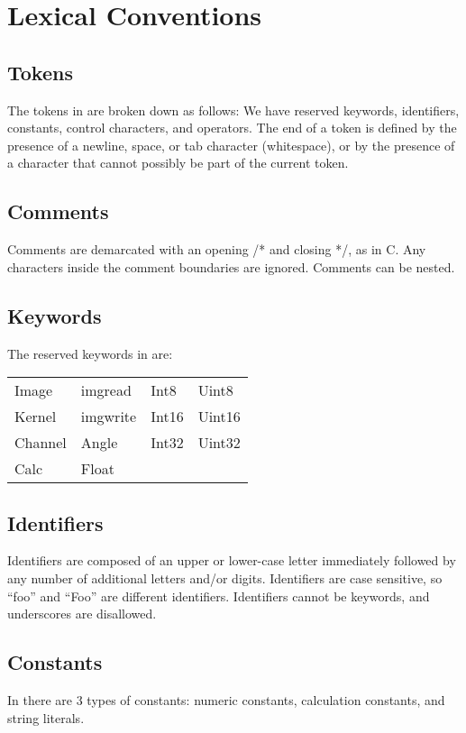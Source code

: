 \section{Lexical Conventions}
\label{sec:lex}

\subsection{Tokens}
\label{ssec:tokens}
The tokens in \sys{} are broken down as follows: We have reserved
keywords, identifiers, constants, control characters, and operators.
The end of a token is defined by the presence of a newline, space,
or tab character (whitespace), or by the presence of a character that
cannot possibly be part of the current token.

\subsection{Comments}
\label{ssec:comments}
Comments are demarcated with an opening /* and closing */, as in C.
Any characters inside the comment boundaries are ignored. Comments
can be nested.

\subsection{Keywords}
\label{ssec:keywords}
The reserved keywords in \sys{} are:
\begin{center}\begin{tabular}{l l l l}
Image & imgread & Int8 & Uint8\\
Kernel & imgwrite & Int16 & Uint16\\
Channel & Angle & Int32 & Uint32\\
Calc & Float & &
\end{tabular}\end{center}

\subsection{Identifiers}
\label{ssec:identifiers}
Identifiers are composed of an upper or lower-case letter immediately
followed by any number of additional letters and/or digits. Identifiers
are case sensitive, so ``foo'' and ``Foo'' are different identifiers.
Identifiers cannot be keywords, and underscores are disallowed.

\subsection{Constants}
\label{ssec:constants}
In \sys{} there are 3 types of constants: numeric constants,
calculation constants, and string literals.

